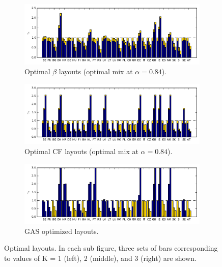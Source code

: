 \documentclass[a4paper, 5p, sort&compress]{elsarticle}%
\newcommand{\chromowidth}{1.00 \columnwidth}
\begin{document}
\begin{figure}[p]
  \centering
  \begin{subfigure}{2\columnwidth}
    \includegraphics[width = \chromowidth, center]{betaLayouts}
    \caption{Optimal $\beta$ layouts (optimal mix at $\alpha = 0.84$).}
    \label{fig:betaOpt}    
  \end{subfigure}
  \begin{subfigure}{2\columnwidth}
    \includegraphics[width = \chromowidth, center]{cfMaxLayouts}
    \caption{Optimal CF layouts (optimal mix at $\alpha = 0.84$).}
    \label{fig:cfMaxOpt}    
  \end{subfigure}
  \begin{subfigure}{2\columnwidth}
    \includegraphics[width = \chromowidth, center]{gasLayouts}
    \caption{GAS optimized layouts.}
    \label{fig:agdOpt}    
  \end{subfigure}
  \caption{Optimal layouts. In each sub figure, three sets of bars
    corresponding to values of K = 1 (left), 2 (middle), and 3 (right)
    are shown.}
  \label{fig:optLayouts}
\end{figure}
\end{document}
